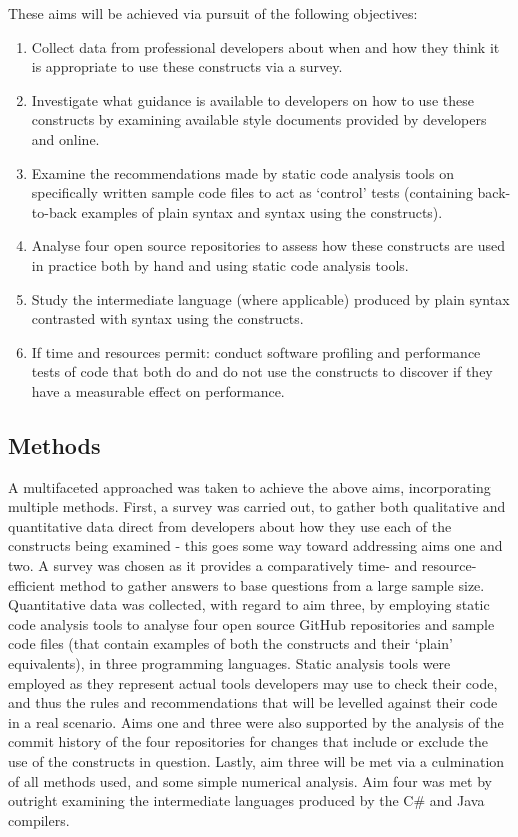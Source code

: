 \documentclass{article}
\begin{document}
        These aims will be achieved via pursuit of the following objectives:
        \begin{enumerate}
            \item Collect data from professional developers about when and how they think it is appropriate to use these constructs via a survey.
            \item Investigate what guidance is available to developers on how to use these constructs by examining available style documents provided by developers and online.
            \item Examine the recommendations made by static code analysis tools on specifically written sample code files to act as `control' tests (containing back-to-back examples of plain syntax and syntax using the constructs).
            \item Analyse four open source repositories to assess how these constructs are used in practice both by hand and using static code analysis tools.
            \item Study the intermediate language (where applicable) produced by plain syntax contrasted with syntax using the constructs.
            \item If time and resources permit: conduct software profiling and performance tests of code that both do and do not use the constructs to discover if they have a measurable effect on performance.
        \end{enumerate}

    \subsection{Methods}
        A multifaceted approached was taken to achieve the above aims, incorporating multiple methods. First, a survey was carried out, to gather both qualitative and quantitative data direct from developers about how they use each of the constructs being examined - this goes some way toward addressing aims one and two. A survey was chosen as it provides a comparatively time- and resource-efficient method to gather answers to base questions from a large sample size.
        Quantitative data was collected, with regard to aim three, by employing static code analysis tools to analyse four open source GitHub repositories and sample code files (that contain examples of both the constructs and their `plain' equivalents), in three programming languages. Static analysis tools were employed as they represent actual tools developers may use to check their code, and thus the rules and recommendations that will be levelled against their code in a real scenario.
        Aims one and three were also supported by the analysis of the commit history of the four repositories for changes that include or exclude the use of the constructs in question. Lastly, aim three will be met via a culmination of all methods used, and some simple numerical analysis.
        Aim four was met by outright examining the intermediate languages produced by the C\# and Java compilers.
\end{document}

